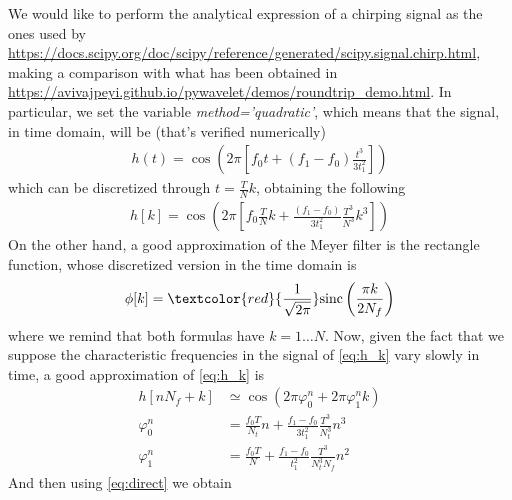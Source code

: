 \documentclass{article}
\begin{document}
We would like to perform the analytical expression of a chirping signal as the ones used by \url{https://docs.scipy.org/doc/scipy/reference/generated/scipy.signal.chirp.html}, making a comparison with what has been obtained in \url{https://avivajpeyi.github.io/pywavelet/demos/roundtrip_demo.html}. In particular, we set the variable \textit{method='quadratic'}, which means that the signal, in time domain, will be (that's verified numerically)
\begin{align}\label{eq:h_t_cubic}
h(t)=\cos(2\pi\left[f_0t+(f_1-f_0)\frac{t^3}{3t_1^2}\right])
\end{align}
which can be discretized through $t=\frac{T}{N}k$, obtaining the following
\begin{align}\label{eq:h_k}
h[k]=\cos(2\pi\left[f_0\frac{T}{N}k+\frac{(f_1-f_0)}{3t_1^2}\frac{T^3}{N^3}k^3\right])
\end{align}
On the other hand, a good approximation of the Meyer filter is the rectangle function, whose discretized version in the time domain is
\begin{align}
\phi[k]=\textcolor{red}{\frac{1}{\sqrt{2\pi}}}\text{sinc}\left(\frac{\pi k}{2 N_f}\right)
\end{align}
where we remind that both formulas have $k=1\dots N$. Now, given the fact that we suppose the characteristic frequencies in the signal of \eqref{eq:h_k} vary slowly in time, a good approximation of \eqref{eq:h_k} is
\begin{align}
h[nN_f+k]&\simeq\cos(2\pi\varphi_0^n+2\pi\varphi_1^n k)\nonumber\\
\varphi_0^n&=\frac{f_0T}{N_t}n+\frac{f_1-f_0}{3t_1^2}\frac{T^3}{N_t^3}n^3\nonumber\\
\varphi_1^n&=\frac{f_0T}{N}+\frac{f_1-f_0}{t_1^2}\frac{T^3}{N_t^3N_f}n^2
\end{align}
And then using
\eqref{eq:direct} we obtain
\end{document}
